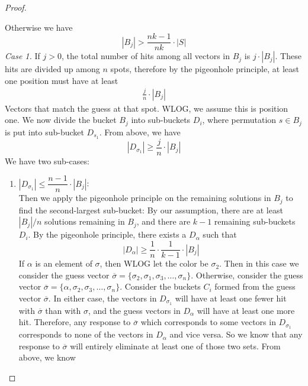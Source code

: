 \documentclass[12pt, a4paper]{article}
\begin{document}
\begin{enumerate}
\begin{proof}
\begin{enumerate}[label=]
			Otherwise we have
				\begin{equation*}
				|B_j|>\frac{nk - 1}{nk}\cdot|S|
				\end{equation*}
			\textit{Case 1.} If $j>0$, the total number of hits among all vectors in
			$B_j$ is $j\cdot |B_j|$. These hits are divided up among $n$ spots,
			therefore by the pigeonhole principle, at least one position
			must have at least
				\begin{align*}
				\frac{j}{n}\cdot|B_j|
				\end{align*}
			Vectors that match the guess at that spot. WLOG, we assume this is
			position one. We now divide the bucket $B_j$ into sub-buckets $D_i$,
			where permutation $s\in B_j$ is put into sub-bucket $D_{s_1}$. From above,
			we have 
			\begin{equation*}
			|D_{\sigma_1}|\ge \frac{j}{n}\cdot|B_j|
			\end{equation*}
			We have two sub-cases:
				\begin{enumerate}[label=\roman*.]
				\item $|D_{\sigma_1}|\le \dfrac{n-1}{n}\cdot|B_j|$:\\
				Then we apply the pigeonhole principle on the remaining solutions
				in $B_j$ to find the second-largest sub-bucket:
				By our assumption, there are at least $|B_j|/n$ solutions remaining
				in $B_j$, and there are $k-1$ remaining sub-buckets $D_i$. By the
				pigeonhole principle, there exists a $D_\alpha$ such that 
				\begin{equation*}
				|D_\alpha| \ge \frac{1}{n}\cdot\frac{1}{k-1}\cdot|B_j|
				\end{equation*}
				If $\alpha$ is an element of $\sigma$, then WLOG
    			let the color be $\sigma_2$. Then in this case we consider the
				guess vector
    			$\overline{\sigma}=\{\sigma_2, \sigma_1, \sigma_3, \ldots, \sigma_n\}$.
    			Otherwise, consider the guess vector
    			$\overline{\sigma}=\{\alpha, \sigma_2, \sigma_3, \ldots, \sigma_n\}$.
				Consider the buckets $C_i$ formed from the guess vector
				$\overline{\sigma}$. In either case, the vectors in $D_{\sigma_1}$ will
				have at least one fewer hit with $\overline{\sigma}$ than with
				$\sigma$, and the guess vectors in $D_{\alpha}$ will have at least
				one more hit. Therefore, any response to $\overline{\sigma}$ which
				corresponds to some vectors in $D_{\sigma_1}$ corresponds to none
				of the vectors in $D_{\alpha}$ and vice versa. So we know that any
				response to $\overline{\sigma}$ will entirely eliminate at least one
				of those two sets. From above, we know

\end{enumerate}
\end{enumerate}
\end{proof}
\end{enumerate}
\end{document}

